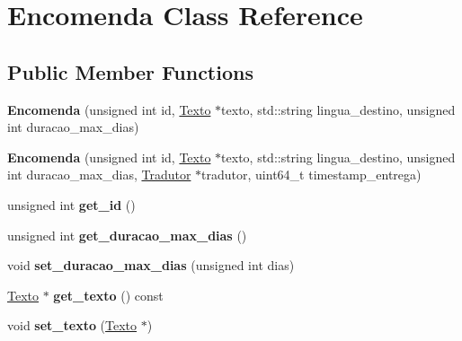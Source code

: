\hypertarget{class_encomenda}{\section{Encomenda Class Reference}
\label{class_encomenda}
}
\subsection*{Public Member Functions}
\begin{DoxyCompactItemize}
\item 
\hypertarget{class_encomenda_acd872b2d444252423746ee7529b48ae8}{{\bfseries Encomenda} (unsigned int id, \hyperlink{class_texto}{Texto} $\ast$texto, std\-::string lingua\-\_\-destino, unsigned int duracao\-\_\-max\-\_\-dias)}\label{class_encomenda_acd872b2d444252423746ee7529b48ae8}

\item 
\hypertarget{class_encomenda_a5009ce207f856836a16e93a6454e93b8}{{\bfseries Encomenda} (unsigned int id, \hyperlink{class_texto}{Texto} $\ast$texto, std\-::string lingua\-\_\-destino, unsigned int duracao\-\_\-max\-\_\-dias, \hyperlink{class_tradutor}{Tradutor} $\ast$tradutor, uint64\-\_\-t timestamp\-\_\-entrega)}\label{class_encomenda_a5009ce207f856836a16e93a6454e93b8}

\item 
\hypertarget{class_encomenda_a600345853bc2238c189de0afcd1c8d09}{unsigned int {\bfseries get\-\_\-id} ()}\label{class_encomenda_a600345853bc2238c189de0afcd1c8d09}

\item 
\hypertarget{class_encomenda_a179dcd8d6ccaa8de0bf87a922c5ce2f8}{unsigned int {\bfseries get\-\_\-duracao\-\_\-max\-\_\-dias} ()}\label{class_encomenda_a179dcd8d6ccaa8de0bf87a922c5ce2f8}

\item 
\hypertarget{class_encomenda_ab3b5fc8fdde834b5c80f42ff0a2bf88b}{void {\bfseries set\-\_\-duracao\-\_\-max\-\_\-dias} (unsigned int dias)}\label{class_encomenda_ab3b5fc8fdde834b5c80f42ff0a2bf88b}

\item 
\hypertarget{class_encomenda_a0a31fd2124968159893d3257b9cadd15}{\hyperlink{class_texto}{Texto} $\ast$ {\bfseries get\-\_\-texto} () const }\label{class_encomenda_a0a31fd2124968159893d3257b9cadd15}

\item 
\hypertarget{class_encomenda_a82f5685295900da96914a1969e3a454f}{void {\bfseries set\-\_\-texto} (\hyperlink{class_texto}{Texto} $\ast$)}\label{class_encomenda_a82f5685295900da96914a1969e3a454f}


\end{DoxyCompactItemize}
